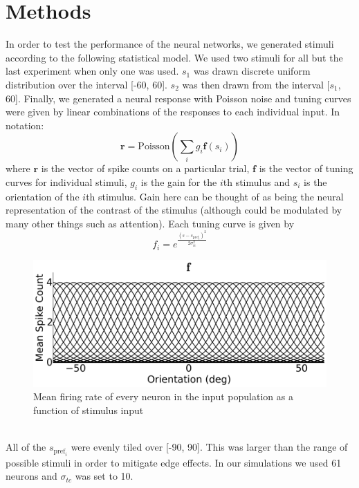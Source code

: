 \documentclass{article} %
\begin{document}
\section{Methods}
In order to test the performance of the neural networks, we generated stimuli according to the following statistical model. We used two stimuli for all but the last experiment when only one was used. $s_1$ was drawn discrete uniform distribution over the interval [-60, 60]. $s_2$ was then drawn from the interval [$s_1$, 60]. Finally, we generated a neural response with Poisson noise and tuning curves were given by linear combinations of the responses to each individual input. In notation:
\begin{equation}
	\mathbf{r} = \text{Poisson}(\sum_i g_i \mathbf{f}(s_i))
\end{equation}
where $\mathbf{r}$ is the vector of spike counts on a particular trial, $\mathbf{f}$ is the vector of tuning curves for individual stimuli, $g_i$ is the gain for the $i$th stimulus and $s_i$ is the orientation of the $i$th stimulus. Gain here can be thought of as being the neural representation of the contrast of the stimulus (although could be modulated by many other things such as attention).
Each tuning curve is given by
\begin{equation}
	f_i = e^\frac{(s - s_{\text{pref}_i})^2}{2 \sigma_{tc}^2}
\end{equation}
\begin{figure}[h]
\centering
\includegraphics[width = \textwidth]{Tuning_Curves.png}
\caption{Mean firing rate of every neuron in the input population as a function of stimulus input}
\end{figure}
\\
All of the $s_{\text{pref}_i}$ were evenly tiled over [-90, 90]. This was larger than the range of possible stimuli in order to mitigate edge effects. In our simulations we used 61 neurons and $\sigma_{tc}$ was set to 10.
\\
\\
\end{document}
